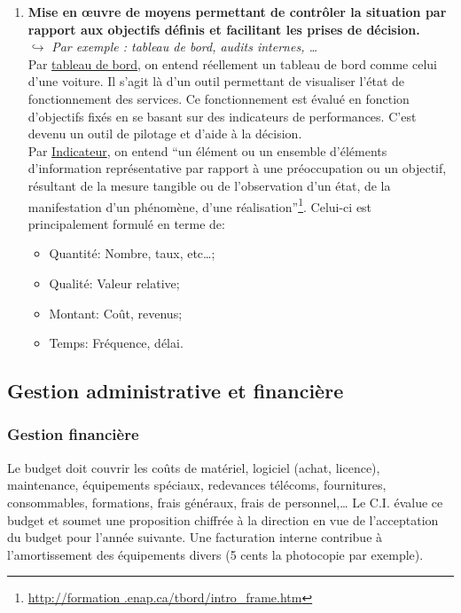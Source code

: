 \documentclass[10pt,a4paper,oneside,titlepage]{report}
\newcommand{\titre}[1]{\textcolor{title}{#1}}
\newcommand{\newterm}[1]{\textit{#1}}
\newcommand{\strong}[1]{\textbf{\titre{#1}}}
\begin{document}
\begin{enumerate}
\item \strong{Mise en \oe uvre de moyens permettant de contrôler la situation
par rapport aux objectifs définis et facilitant les prises de décision.} \\
$\hookrightarrow$ \newterm{Par exemple : tableau de bord, audits internes, \dots
} \\
Par \underline{tableau de bord}, on entend réellement un tableau de bord comme
celui d'une voiture. Il s'agit là d'un outil permettant de visualiser l'état de
fonctionnement des services. Ce fonctionnement est évalué en fonction
d'objectifs fixés en se basant sur des indicateurs de performances. C'est devenu
un outil de pilotage et d'aide à la décision.\\

Par \underline{Indicateur}, on entend ``un élément ou un ensemble d’éléments
d’information représentative par rapport à une préoccupation ou un objectif,
résultant de la mesure tangible ou de l’observation d’un état, de la
manifestation d’un phénomène, d’une réalisation''\footnote{\url{http://formation
.enap.ca/tbord/intro_frame.htm}}. Celui-ci est principalement formulé en terme
de:
\begin{itemize}
\item Quantité: Nombre, taux, etc\dots;
\item Qualité: Valeur relative;
\item Montant: Coût, revenus;
\item Temps: Fréquence, délai.
\end{itemize}
\end{enumerate}

\subsection{Gestion administrative et financière}

\subsubsection{Gestion financière}

Le budget doit couvrir les coûts de matériel, logiciel (achat, licence),
maintenance, équipements spéciaux, redevances télécoms, fournitures,
consommables, formations, frais généraux, frais de personnel,\dots
Le C.I. évalue ce budget et soumet une proposition chiffrée à la direction en
vue de l'acceptation du budget pour l'année suivante. Une facturation interne
contribue à l'amortissement des équipements divers (5 cents la photocopie par
exemple).
\end{document}
